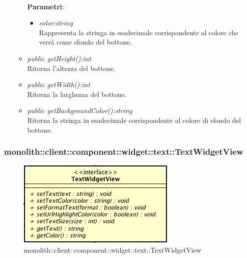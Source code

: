\begin{itemize}
\begin{itemize}
		\\ \textbf{Parametri}: \begin{itemize}
		\item \textit{color:string}\\
		Rappresenta la stringa in esadecimale corrispondente al colore che verrà come sfondo del bottone.
		\end{itemize}
	\item \textit{public getHeight():int}\\
	Ritorna l'altezza del bottone.
	\item \textit{public getWidth():int}\\
	Ritorna la larghezza del bottone.
	\item \textit{public getBackgroundColor():string}\\
	Ritorna la stringa in esadecimale corrispondente al colore di sfondo del bottone.
	\end{itemize}
\end{itemize}

\subsubsection{monolith::client::component::widget::text::TextWidgetView}

\label{monolith::client::component::widget::text::TextWidgetView}
\begin{figure}[H]
	\centering
	\includegraphics[scale=0.5]{Sezioni/SottosezioniST/img/TextWidgetView.png}
	\caption{monolith::client::component::widget::text::TextWidgetView}
\end{figure}

